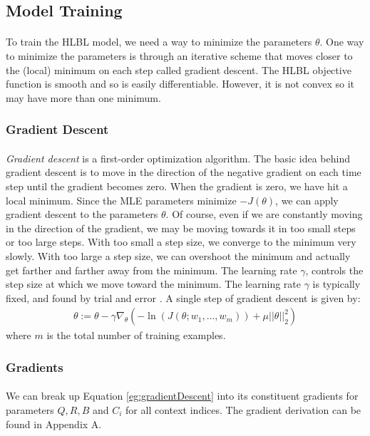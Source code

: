 \subsection{Model Training}
\paragraph{}
To train the HLBL model, we need a way to minimize the parameters $\theta$. One way to minimize the parameters is through an iterative scheme that moves closer to the (local) minimum on each step called gradient descent. The HLBL objective function is smooth and so is easily differentiable. However, it is not convex so it may have more than one minimum. 
\subsubsection{Gradient Descent}
\paragraph{}
\emph{Gradient descent} is a first-order optimization algorithm. The basic idea behind gradient descent is to move in the direction of the negative gradient on each time step until the gradient becomes zero. When the gradient is zero, we have hit a local minimum. Since the MLE parameters minimize $-J(\theta)$, we can apply gradient descent to the parameters $\theta$. Of course, even if we are constantly moving in the direction of the gradient, we may be moving towards it in too small steps or too large steps. With too small a step size, we converge to the minimum very slowly. With too large a step size, we can overshoot the minimum and actually get farther and farther away from the minimum. The learning rate $\gamma$, controls the step size at which we move toward the minimum. The learning rate $\gamma$ is typically fixed, and found by trial and error \cite{Elkan2013}.
A single step of gradient descent is given by:
\begin{align}
\theta := \theta - \gamma \nabla_\theta \left( -\ln(J(\theta;w_1,\dots, w_m)) +  \mu ||\theta||^2_2 \right) \label{eg:gradientDescent} 
\end{align}
where $m$ is the total number of training examples.

\subsubsection{Gradients}
\paragraph{}
We can break up Equation \ref{eg:gradientDescent} into its constituent gradients for parameters $Q,R,B$ and $C_i$ for all context indices. The gradient derivation can be found in Appendix A.

